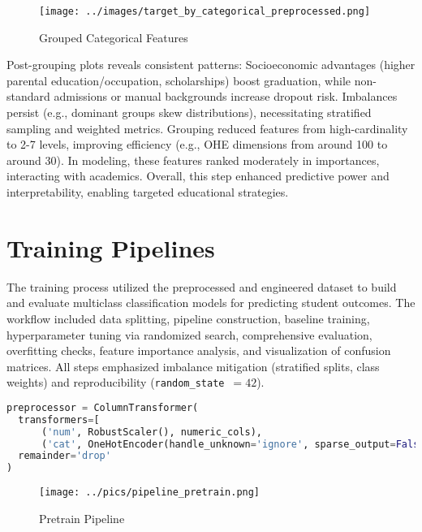 \documentclass[twoside,final]{hcmut-report}
\begin{document}
\begin{figure}[H]
  \centering
  \texttt{[image: ../images/target\_by\_categorical\_preprocessed.png]}
  \caption{Grouped Categorical Features}
  \label{grouped_cat}
\end{figure}

Post-grouping plots reveals consistent patterns: Socioeconomic advantages (higher parental education/occupation, scholarships) boost graduation, while non-standard admissions or manual backgrounds increase dropout risk. Imbalances persist (e.g., dominant groups skew distributions), necessitating stratified sampling and weighted metrics. Grouping reduced features from high-cardinality to 2-7 levels, improving efficiency (e.g., OHE dimensions from around 100 to around 30). In modeling, these features ranked moderately in importances, interacting with academics. Overall, this step enhanced predictive power and interpretability, enabling targeted educational strategies.

\section{Training Pipelines}
The training process utilized the preprocessed and engineered dataset to build and evaluate multiclass classification models for predicting student outcomes. The workflow included data splitting, pipeline construction, baseline training, hyperparameter tuning via randomized search, comprehensive evaluation, overfitting checks, feature importance analysis, and visualization of confusion matrices. All steps emphasized imbalance mitigation (stratified splits, class weights) and reproducibility (\texttt{random\_state}~$=42$).
\begin{lstlisting}[language=python]
preprocessor = ColumnTransformer(
  transformers=[
      ('num', RobustScaler(), numeric_cols),
      ('cat', OneHotEncoder(handle_unknown='ignore', sparse_output=False), categorical_cols)],
  remainder='drop'
)
\end{lstlisting}
\begin{figure}[H]
  \centering
  \texttt{[image: ../pics/pipeline\_pretrain.png]}
  \caption{Pretrain Pipeline}
  \label{pretrain}
\end{figure}
\end{document}
